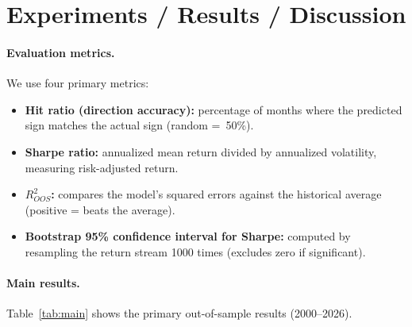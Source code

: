 \documentclass{article}
\begin{document}
\section{Experiments / Results / Discussion}

\paragraph{Evaluation metrics.}
We use four primary metrics:
\begin{itemize}
  \item \textbf{Hit ratio (direction accuracy):} percentage of months where the
    predicted sign matches the actual sign (random =~50\%).
  \item \textbf{Sharpe ratio:} annualized mean return divided by annualized
    volatility, measuring risk-adjusted return.
  \item \textbf{$R^2_{OOS}$:} compares the model's squared errors against the
    historical average (positive = beats the average).
  \item \textbf{Bootstrap 95\% confidence interval for Sharpe:} computed by
    resampling the return stream 1000 times (excludes zero if significant).
\end{itemize}

\paragraph{Main results.}
Table~\ref{tab:main} shows the primary out-of-sample results (2000--2026).
\end{document}
